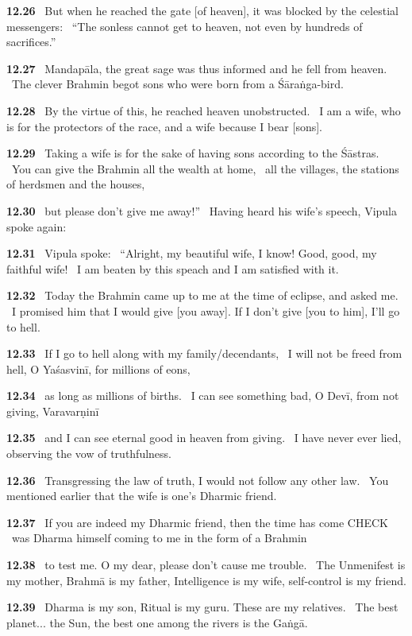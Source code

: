 \documentclass{article}
\begin{document}
\textbf{12.26}%
\ But when he reached the gate [of heaven], it was blocked by the celestial messengers:%
\ ``The sonless cannot get to heaven, not even by hundreds of sacrifices.''%


\textbf{12.27}%
\ Mandapāla, the great sage was thus informed and he fell from heaven.%
\ The clever Brahmin begot sons who were born from a Śāraṅga-bird.%


\textbf{12.28}%
\ By the virtue of this, he reached heaven unobstructed.%
\ I am a wife, who is for the protectors of the race, and a wife because I bear [sons].%


\textbf{12.29}%
\ Taking a wife is for the sake of having sons according to the Śāstras.%
\ You can give the Brahmin all the wealth at home,%
\      all the villages, the stations of herdsmen and the houses,%


\textbf{12.30}%
\ but please don't give me away!''%
\ Having heard his wife's speech, Vipula spoke again:%


\textbf{12.31}%
\ Vipula spoke:%
\ ``Alright, my beautiful wife, I know! Good, good, my faithful wife!%
\ I am beaten by this speach and I am satisfied with it.%


\textbf{12.32}%
\ Today the Brahmin came up to me at the time of eclipse, and asked me.%
\ I promised him that I would give [you away]. If I don't give [you to him], I'll go to hell.%


\textbf{12.33}%
\ If I go to hell along with my family/decendants,%
\ I will not be freed from hell, O Yaśasvinī, for millions of eons,%


\textbf{12.34}%
\ as long as millions of births.%
\ I can see something bad, O Devī, from not giving, Varavarṇinī%


\textbf{12.35}%
\ and I can see eternal good in heaven from giving.%
\ I have never ever lied, observing the vow of truthfulness.%


\textbf{12.36}%
\ Transgressing the law of truth, I would not follow any other law.%
\ You mentioned earlier that the wife is one's Dharmic friend.%


\textbf{12.37}%
\ If you are indeed my Dharmic friend, then the time has come CHECK%
\ was Dharma himself coming to me in the form of a Brahmin%


\textbf{12.38}%
\ to test me. O my dear, please don't cause me trouble.%
\ The Unmenifest is my mother, Brahmā is my father, Intelligence is my wife, self-control is my friend.%


\textbf{12.39}%
\ Dharma is my son, Ritual is my guru. These are my relatives.%
\ The best planet... the Sun, the best one among the rivers is the Gaṅgā.%
\end{document}
